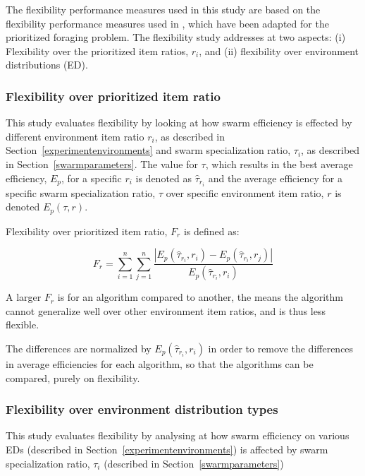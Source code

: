 The flexibility performance measures used in this study are based on the flexibility performance measures used in \cite{hecker2015beyond}, which have been adapted for the prioritized foraging problem. The flexibility study addresses at two aspects: (i) Flexibility over the prioritized item ratios, $r_i$, and (ii) flexibility over environment distributions (ED).

\subsubsection{Flexibility over prioritized item ratio}
\label{setup:flexibility:prioritizeditemratio}

This study evaluates flexibility by looking at how swarm efficiency is effected by different environment item ratio $r_i$, as described in Section~\ref{experimentenvironments} and swarm specialization ratio, $\tau_i$, as described in Section~\ref{swarmparameters}. The value for $\tau$, which results in the best average efficiency, $E_p$, for a specific $r_i$ is denoted as $\hat{\tau}_{r_i}$ and the average efficiency for a specific swarm specialization ratio, $\tau$ over specific environment item ratio, $r$ is denoted $E_p(\tau, r)$.

Flexibility over prioritized item ratio, $F_r$ is defined as:

\begin{equation}
	F_r = \sum_{i=1}^{n} \sum_{j=1}^{n} \dfrac{|E_p(\hat{\tau}_{r_i}, {r_i})-E_p(\hat{\tau}_{r_i}, {r_j})|}{E_p(\hat{\tau}_{r_i}, {r_i})}
\end{equation}

A larger $F_r$ is for an algorithm compared to another, the means the algorithm cannot generalize well over other  environment item ratios, and is thus less flexible.

The differences are normalized by $E_p(\hat{\tau}_{r_i}, {r_i})$ in order to remove the differences in average efficiencies for each algorithm, so that the algorithms can be compared, purely on flexibility.


\subsubsection{Flexibility over environment distribution types}
\label{setup:flexibility:environmentdistributions}

This study evaluates flexibility by analysing at how swarm efficiency on various EDs (described in Section~\ref{experimentenvironments}) is affected by swarm specialization ratio, $\tau_i$ (described in Section~\ref{swarmparameters})

